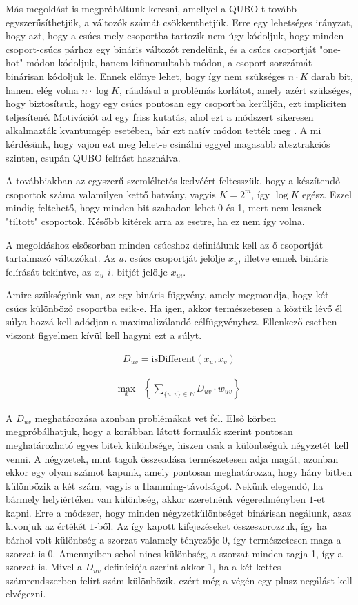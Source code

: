 Más megoldást is megpróbáltunk keresni, amellyel a QUBO-t tovább egyszerűsíthetjük, a változók számát csökkenthetjük. Erre egy lehetséges irányzat, hogy azt, hogy a csúcs mely csoportba tartozik nem úgy kódoljuk, hogy minden csoport-csúcs párhoz egy bináris változót rendelünk, és a csúcs csoportját "one-hot" módon kódoljuk, hanem kifinomultabb módon, a csoport sorszámát binárisan kódoljuk le. Ennek előnye lehet, hogy így nem szükséges $n \cdot K$ darab bit, hanem elég volna $n \cdot \log K$, ráadásul a problémás korlátot, amely azért szükséges, hogy biztosítsuk, hogy egy csúcs pontosan egy csoportba kerüljön, ezt impliciten teljesítené. Motivációt ad egy friss kutatás, ahol ezt a módszert sikeresen alkalmazták kvantumgép esetében, bár ezt natív módon tették meg  \cite{fuchs2020efficient}. A mi kérdésünk, hogy vajon ezt meg lehet-e csinálni eggyel magasabb absztrakciós szinten, csupán QUBO felírást használva.

A továbbiakban az egyszerű szemléltetés kedvéért feltesszük, hogy a készítendő csoportok száma valamilyen kettő hatvány, vagyis $K=2^m$, így $\log K$ egész. Ezzel mindig feltehető, hogy minden bit szabadon lehet 0 és 1, mert nem lesznek "tiltott" csoportok. Később kitérek arra az esetre, ha ez nem így volna.

A megoldáshoz elsősorban minden csúcshoz definiálunk kell az ő csoportját tartalmazó változókat. Az $u.$ csúcs csoportját jelölje $x_u$, illetve ennek bináris felírását tekintve, az $x_u$ $i.$ bitjét jelölje $x_{ui}$.

Amire szükségünk van, az egy bináris függvény, amely megmondja, hogy két csúcs különböző csoportba esik-e. Ha igen, akkor természetesen a köztük lévő él súlya hozzá kell adódjon a maximalizálandó célfüggvényhez. Ellenkező esetben viszont figyelmen kívül kell hagyni ezt a súlyt.

\begin{align}
D_{uv} = \text{isDifferent}(x_u,x_v)
\end{align}

\begin{align} 
	\max_{x} & \left\{\sum _{\{u,v\} \in E } D_{uv} \cdot w_{uv} \right\} 
\end{align}

A $D_{uv}$ meghatározása azonban problémákat vet fel. Első körben megpróbálhatjuk, hogy a korábban látott formulák szerint pontosan meghatározható egyes bitek különbsége, hiszen csak a különbségük négyzetét kell venni. A négyzetek, mint tagok összeadása természetesen adja magát, azonban ekkor egy olyan számot kapunk, amely pontosan meghatározza, hogy hány bitben különbözik a két szám, vagyis a Hamming-távolságot. Nekünk elegendő, ha bármely helyiértéken van különbség, akkor szeretnénk végeredményben $1$-et kapni. Erre a módszer, hogy minden négyzetkülönbséget binárisan negálunk, azaz kivonjuk az értékét $1$-ből. Az így kapott kifejezéseket összeszorozzuk, így ha bárhol volt különbség a szorzat valamely tényezője 0, így természetesen maga a szorzat is 0. Amennyiben sehol nincs különbség, a szorzat minden tagja 1, így a szorzat is. Mivel a $D_{uv}$ definíciója szerint akkor 1, ha a két kettes számrendszerben felírt szám különbözik, ezért még a végén egy plusz negálást kell elvégezni.

